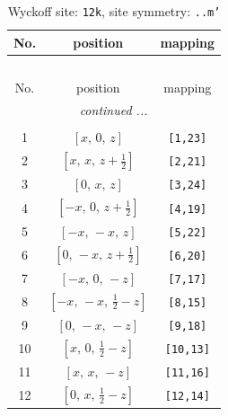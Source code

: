 \documentclass[fleqn,8pt]{jsarticle}
\begin{document}
\begin{longtable}{ccc}
\caption{Wyckoff site: {\tt 12k}, site symmetry: {\tt ..m'}}
 \\
 \hline \hline
No. & position & mapping \\ \hline \endfirsthead

\multicolumn{2}{l}{\tablename\ \thetable{}} \\
 \hline \hline
No. & position & mapping \\ \hline \endhead

 \hline \hline
\multicolumn{2}{r}{\footnotesize\it continued ...} \\ \endfoot

 \hline \hline
\multicolumn{2}{r}{} \\ \endlastfoot

1 & $\left[ x,\, 0,\, z \right]$ & {\tt [1,23]} \\ \hline
2 & $\left[ x,\, x,\, z + \frac{1}{2} \right]$ & {\tt [2,21]} \\ \hline
3 & $\left[ 0,\, x,\, z \right]$ & {\tt [3,24]} \\ \hline
4 & $\left[ - x,\, 0,\, z + \frac{1}{2} \right]$ & {\tt [4,19]} \\ \hline
5 & $\left[ - x,\, - x,\, z \right]$ & {\tt [5,22]} \\ \hline
6 & $\left[ 0,\, - x,\, z + \frac{1}{2} \right]$ & {\tt [6,20]} \\ \hline
7 & $\left[ - x,\, 0,\, - z \right]$ & {\tt [7,17]} \\ \hline
8 & $\left[ - x,\, - x,\, \frac{1}{2} - z \right]$ & {\tt [8,15]} \\ \hline
9 & $\left[ 0,\, - x,\, - z \right]$ & {\tt [9,18]} \\ \hline
10 & $\left[ x,\, 0,\, \frac{1}{2} - z \right]$ & {\tt [10,13]} \\ \hline
11 & $\left[ x,\, x,\, - z \right]$ & {\tt [11,16]} \\ \hline
12 & $\left[ 0,\, x,\, \frac{1}{2} - z \right]$ & {\tt [12,14]} \\
\end{longtable}
\renewcommand{\arraystretch}{1.2}
\end{document}
